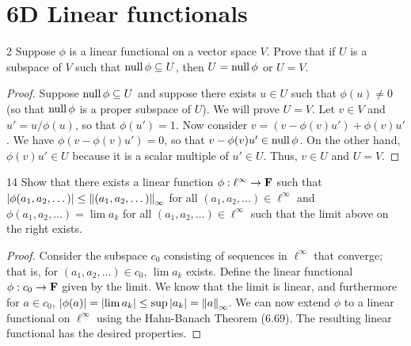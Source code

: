 \section{6D Linear functionals}


\begin{exercise}{2}
Suppose $\phi$ is a linear functional on a vector space $V$.
Prove that if $U$ is a subspace of $V$ such that $\operatorname*{null} \phi \subseteq U$, then $U = \operatorname*{null} \phi$ or $U = V$.
\end{exercise}
\begin{proof}
Suppose $\operatorname*{null} \phi \subseteq U$ and suppose there exists $u \in U$ such that $\phi(u) \neq 0$ (so that $\operatorname*{null} \phi$ is a proper subspace of $U$).
We will prove $U = V$.
Let $v \in V$ and $u' = u/\phi(u)$, so that $\phi(u') = 1$.
Now consider $v = (v - \phi(v)u') + \phi(v)u'$.
We have $\phi(v - \phi(v)u') = 0$, so that $v - \phi(v)u' \in \operatorname*{null} \phi$.
On the other hand, $\phi(v) u' \in U$ because it is a scalar multiple of $u' \in U$.
Thus, $v \in U$ and $U = V$.
\end{proof} 

\begin{exercise}{14}
Show that there exists a linear function $\phi: \ell^\infty \to \mathbf{F}$ such that $\left\lvert \phi(a_1, a_2, \dots)\right\rvert \leq \left\lVert (a_1, a_2, \dots)\right\rVert_\infty$ for all $(a_1, a_2, \dots) \in \ell^\infty$ and $\phi(a_1, a_2, \dots) = \lim a_k$ for all $(a_1, a_2, \dots) \in \ell^\infty$ such that the limit above on the right exists.
\end{exercise}
\begin{proof}
Consider the subspace $c_0$ consisting of sequences in $\ell^\infty$ that converge;
that is, for $(a_1, a_2, \dots) \in c_0$, $\lim a_k$ exists.
Define the linear functional $\phi: c_0 \to \mathbf{F}$ given by the limit.
We know that the limit is linear, and furthermore for $a \in c_0$, $\left\lvert \phi(a)\right\rvert = \left\lvert \lim a_k\right\rvert \leq \sup \left\lvert a_k\right\rvert = \left\lVert a\right\rVert_\infty$.
We can now extend $\phi$ to a linear functional on $\ell^\infty$ using the Hahn-Banach Theorem (6.69).
The resulting linear functional has the desired properties.
\end{proof} 
